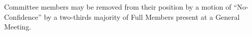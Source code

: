 \begin{clause}
  Committee members may be removed from their position by a motion of ``No-Confidence'' by a two-thirds majority of Full Members present at a General Meeting.
\end{clause}